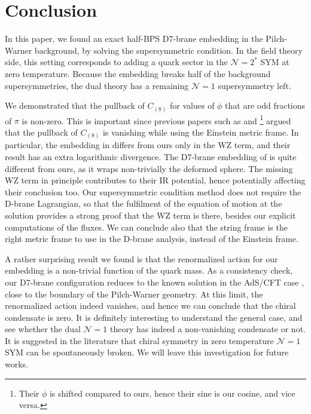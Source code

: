 \section{Conclusion}

In this paper, we found an exact half-BPS D7-brane embedding in the Pilch-Warner background, by solving the supersymmetric condition. In the field theory side, this setting corresponds to adding a quark sector in the $\mathcal{N}=2^*$ SYM at zero temperature. Because the embedding breaks half of the background supersymmetries, the dual theory has a remaining $\mathcal{N}=1$ supersymmetry left.

We demonstrated that the pullback of $C_{(8)}$ for values of $\phi$ that are odd fractions of $\pi$ is non-zero. This is important since previous papers such as \cite{Albash:2011nw} and \cite{Evans:2005ti}\footnote{Their $\phi$ is shifted compared to ours, hence their sine is our cosine, and vice versa.} argued that the pullback of $C_{(8)}$ is vanishing while using the Einstein metric frame. In particular, the embedding in \cite{Albash:2011nw} differs from ours only in the WZ term, and their result has an extra logarithmic divergence. The D7-brane embedding of \cite{Evans:2005ti} is quite different from ours, as it wraps non-trivially the deformed sphere. The missing WZ term in principle contributes to their IR potential, hence potentially affecting their conclusion too. Our supersymmetric condition method does not require the D-brane Lagrangian, so that the fulfilment of the equation of motion at the solution provides a strong proof that the WZ term is there, besides our explicit computations of the fluxes. We can conclude also that the string frame is the right metric frame to use in the D-brane analysis, instead of the Einstein frame.


A rather surprising result we found is that the renormalized action for our embedding is a non-trivial function of the quark mass.
As a consistency check, our D7-brane configuration reduces to the known solution in the AdS/CFT case \cite{Karch:2005ms}, close to the boundary of the Pilch-Warner geometry. At this limit, the renormalized action indeed vanishes, and hence we can conclude that the chiral condensate is zero. It is definitely interesting to understand the general case, and see whether the dual $\mathcal{N}=1$ theory has indeed a non-vanishing condensate or not. It is suggested in the literature that chiral symmetry in zero temperature $\mathcal{N}=1$ SYM can be spontaneously broken. We will leave this investigation for future works.


